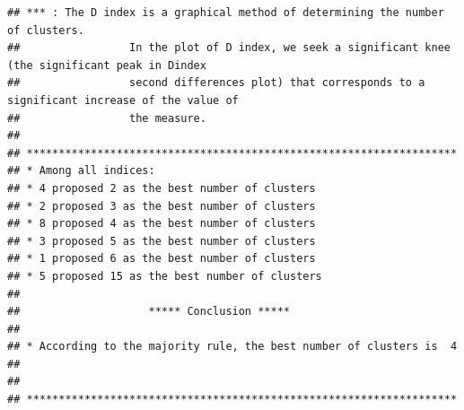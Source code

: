 \documentclass[
]{article}
\begin{document}
\begin{verbatim}
## *** : The D index is a graphical method of determining the number of clusters. 
##                 In the plot of D index, we seek a significant knee (the significant peak in Dindex
##                 second differences plot) that corresponds to a significant increase of the value of
##                 the measure. 
##  
## ******************************************************************* 
## * Among all indices:                                                
## * 4 proposed 2 as the best number of clusters 
## * 2 proposed 3 as the best number of clusters 
## * 8 proposed 4 as the best number of clusters 
## * 3 proposed 5 as the best number of clusters 
## * 1 proposed 6 as the best number of clusters 
## * 5 proposed 15 as the best number of clusters 
## 
##                    ***** Conclusion *****                            
##  
## * According to the majority rule, the best number of clusters is  4 
##  
##  
## *******************************************************************
\end{verbatim}
\end{document}
